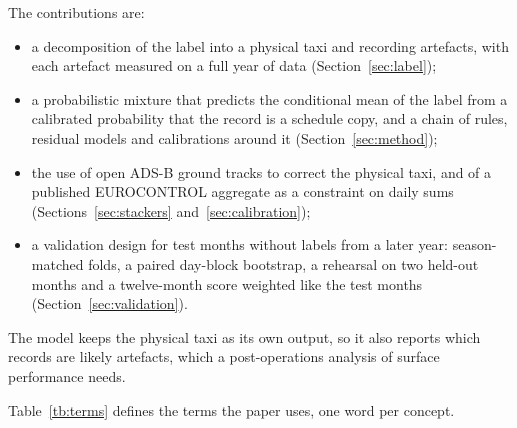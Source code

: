 \documentclass[
  manuscript=article,
  layout=preprint,
  year=2026,
  volume=x,
]{extra/joas}
\begin{document}
The contributions are:
\begin{itemize}
  \item a decomposition of the label into a physical taxi and recording artefacts, with each artefact measured on a full year of data
  (Section~\ref{sec:label});
  \item a probabilistic mixture that predicts the conditional mean of the label from a calibrated probability that the record is a
  schedule copy, and a chain of rules, residual models and calibrations around it (Section~\ref{sec:method});
  \item the use of open ADS-B ground tracks to correct the physical taxi, and of a published EUROCONTROL aggregate as a constraint on daily
  sums (Sections~\ref{sec:stackers} and~\ref{sec:calibration});
  \item a validation design for test months without labels from a later year: season-matched folds, a paired day-block bootstrap, a
  rehearsal on two held-out months and a twelve-month score weighted like the test months (Section~\ref{sec:validation}).
\end{itemize}
The model keeps the physical taxi as its own output, so it also reports which records are likely artefacts, which a post-operations
analysis of surface performance needs.

Table~\ref{tb:terms} defines the terms the paper uses, one word per concept.
\end{document}
